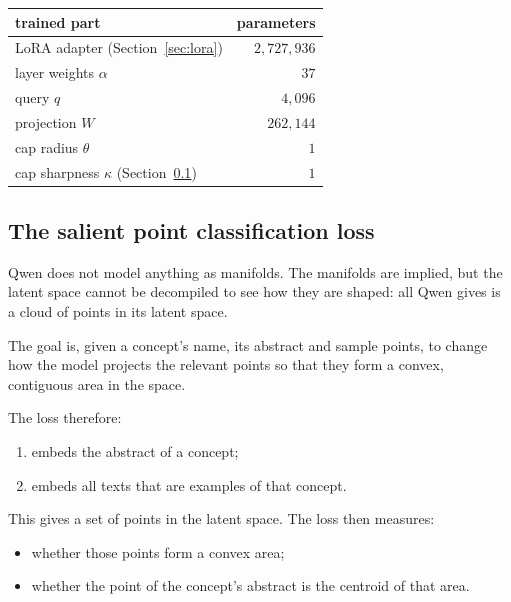 \documentclass[11pt]{article}
\theoremstyle{remark}
\begin{document}
\begin{center}
\begin{tabular}{@{}lr@{}}
\hline
trained part & parameters \\
\hline
LoRA adapter (Section~\ref{sec:lora}) & $2{,}727{,}936$ \\
layer weights $\alpha$ & $37$ \\
query $q$ & $4{,}096$ \\
projection $W$ & $262{,}144$ \\
cap radius $\theta$ & $1$ \\
cap sharpness $\kappa$ (Section~\ref{sec:loss}) & $1$ \\
\hline
\end{tabular}
\end{center}

\subsection{The salient point classification loss}\label{sec:loss}

Qwen does not model anything as manifolds. The manifolds are implied, but the latent space cannot be decompiled to see how they are shaped: all Qwen gives is a cloud of points in its latent space.

The goal is, given a concept's name, its abstract and sample points, to change how the model projects the relevant points so that they form a convex, contiguous area in the space.

The loss therefore:
\begin{enumerate}
  \item embeds the abstract of a concept;
  \item embeds all texts that are examples of that concept.
\end{enumerate}
This gives a set of points in the latent space. The loss then measures:
\begin{itemize}
  \item whether those points form a convex area;
  \item whether the point of the concept's abstract is the centroid of that area.
\end{itemize}
\end{document}
